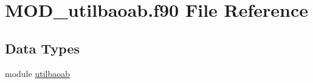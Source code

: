 \hypertarget{MOD__utilbaoab_8f90}{\section{M\-O\-D\-\_\-utilbaoab.\-f90 File Reference}
\label{MOD__utilbaoab_8f90}
}
\subsection*{Data Types}
\begin{DoxyCompactItemize}
\item 
module \hyperlink{classutilbaoab}{utilbaoab}
\end{DoxyCompactItemize}
